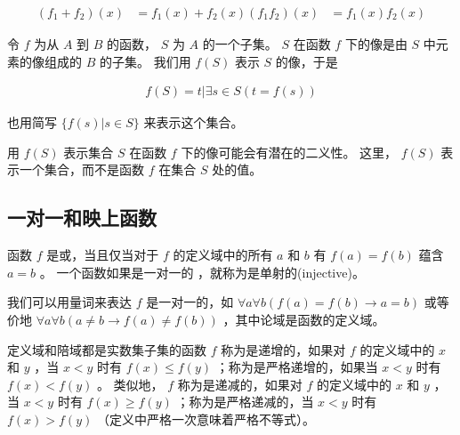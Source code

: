{{\begin{defines}
            \begin{align*}
                (f_1 + f_2)(x) &= f_1(x) + f_2(x)
                (f_1f_2)(x) &= f_1(x)f_2(x)
            \end{align*}
        \end{defines}

        \begin{defines}
            令 $f$ 为从 $A$ 到 $B$ 的函数， $S$ 为 $A$ 的一个子集。
            $S$ 在函数 $f$ 下的像是由 $S$ 中元素的像组成的 $B$ 的子集。
            我们用 $f(S)$ 表示 $S$ 的像，于是

            \begin{align*}
                f(S) = {t | \exists s \in S (t = f(s))}
            \end{align*}

            也用简写 $\{f(s) | s \in S\}$ 来表示这个集合。
        \end{defines}

        \begin{defines}
            用 $f(S)$ 表示集合 $S$ 在函数 $f$ 下的像可能会有潜在的二义性。
            这里， $f(S)$ 表示一个集合，而不是函数 $f$ 在集合 $S$ 处的值。
        \end{defines}
    }

    \subsection{一对一和映上函数}
    {
        \begin{defines}
            函数 $f$ 是或，当且仅当对于 $f$ 的定义域中的所有 $a$ 和 $b$ 有 $f(a) = f(b)$ 蕴含 $a = b$ 。
            一个函数如果是一对一的 ，就称为是单射的(injective)。
        \end{defines}

        \begin{defines}
            我们可以用量词来表达 $f$ 是一对一的，如 $\forall a \forall b (f(a) = f(b) \rightarrow a = b)$ 或等价地 $\forall a \forall b (a \neq b \rightarrow f(a) \neq f(b))$ ，其中论域是函数的定义域。
        \end{defines}

        \begin{defines}
            定义域和陪域都是实数集子集的函数 $f$ 称为是递增的，如果对 $f$ 的定义域中的 $x$ 和 $y$ ，当 $x < y$ 时有 $f(x) \leq f(y)$ ；称为是严格递增的，如果当 $x < y$ 时有 $f(x) < f(y)$ 。
            类似地， $f$ 称为是递减的，如果对 $f$ 的定义域中的 $x$ 和 $y$ ，当 $x < y$ 时有 $f(x) \geq f(y)$ ；称为是严格递减的，当 $x < y$ 时有 $f(x) > f(y)$ （定义中严格一次意味着严格不等式）。
        \end{defines}

}}
